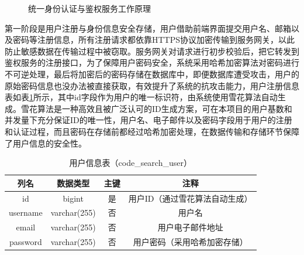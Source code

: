 \documentclass[UTF8,a4paper,12pt]{ctexart}
\numberwithin{equation}{section}
\begin{document}
\begin{figure}[H]
	\caption{统一身份认证与鉴权服务工作原理}
	\label{auth_flow}
\end{figure}
第一阶段是用户注册与身份信息安全存储，用户借助前端界面提交用户名、邮箱以及密码等注册信息，所有注册请求都依靠HTTPS协议加密传输到服务网关，以此防止敏感数据在传输过程中被窃取。服务网关对请求进行初步校验后，把它转发到鉴权服务的注册接口，为了保障用户密码安全，系统采用哈希加密算法对密码进行不可逆处理，最后将加密后的密码存储在数据库中，即便数据库遭受攻击，用户的原始密码信息也没办法被直接获取，有效提升了系统的抗攻击能力，用户注册信息表如表\ref{usertable}所示，其中id字段作为用户的唯一标识符，由系统使用雪花算法自动生成。雪花算法是一种高效且被广泛认可的ID生成方案，可在本项目的用户基数和并发量下充分保证ID的唯一性，用户名、电子邮件以及密码字段用于用户的注册和认证过程，而且密码在存储前都经过哈希加密处理，在数据传输和存储环节保障了用户信息的安全性。\par
\begin{table}[H]
	\centering
	\caption{用户信息表（code\_search\_user）}
	\small
	\begin{tabular}{c c c c}
		\toprule
		列名 & 数据类型 & 主键 & 注释\\
		\midrule
		id & bigint & 是 & 用户ID（通过雪花算法自动生成）\\
		username & varchar(255) & 否 & 用户名\\
		email & varchar(255) & 否 & 用户电子邮件地址\\
		password & varchar(255) & 否 & 用户密码（采用哈希加密存储）\\
		\bottomrule
	\end{tabular}
	\label{usertable}
\end{table}
\end{document}
